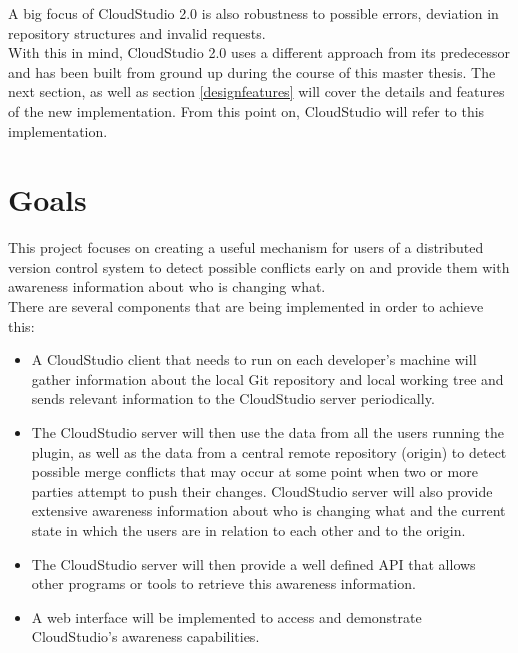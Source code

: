 A big focus of CloudStudio 2.0 is also robustness to possible errors, deviation in repository structures and invalid requests. \\

With this in mind, CloudStudio 2.0 uses a different approach from its predecessor and has been built from ground up during the course of this master thesis. The next section, as well as section \ref{designfeatures} will cover the details and features of the new implementation. From this point on, CloudStudio will refer to this implementation.







\section{Goals}




This project focuses on creating a useful mechanism for users of a distributed version control system to detect possible conflicts early on and provide them with awareness information about who is changing what. \\

There are several components that are being implemented in order to achieve this:


\begin{itemize}

\item A CloudStudio client that needs to run on each developer's machine will gather information about the local Git repository and local working tree and sends relevant information to the CloudStudio server periodically.
\item The CloudStudio server will then use the data from all the users running the plugin, as well as the data from a central remote repository (origin) to detect possible merge conflicts that may occur at some point when two or more parties attempt to push their changes. CloudStudio server will also provide extensive awareness information about who is changing what and the current state in which the users are in relation to each other and to the origin.
\item The CloudStudio server will then provide a well defined API that allows other programs or tools to retrieve this awareness information.
\item A web interface will be implemented to access and demonstrate CloudStudio's awareness capabilities.

\end{itemize}

